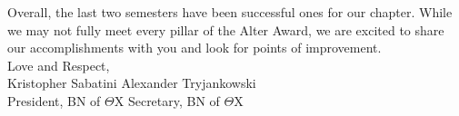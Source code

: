 Overall, the last two semesters have been successful ones for our chapter. While we may not fully meet every pillar of the Alter Award, we are excited to share our accomplishments with you and look for points of improvement. \\

Love and Respect, \\
Kristopher Sabatini \hfill Alexander Tryjankowski \\ 
President, BN of $\Theta$X \hfill Secretary, BN of $\Theta$X \\
